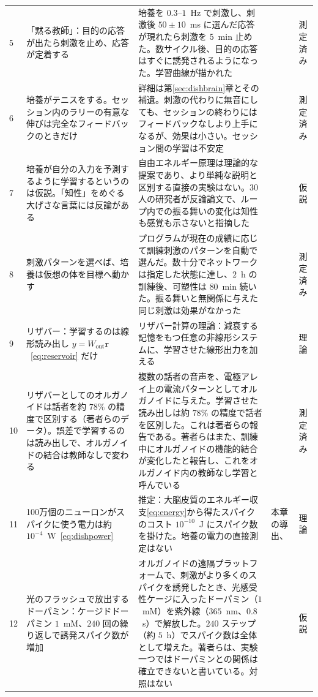 {\begin{longtable}{>{\raggedright}p{0.5cm}>{\raggedright}p{4.0cm}>{\raggedright}p{5.6cm}>{\raggedright}p{2.3cm}>{\raggedright\arraybackslash}p{1.7cm}}
5 & 「黙る教師」：目的の応答が出たら刺激を止め、応答が定着する & 培養を $0.3$--$1$~Hz で刺激し、刺激後 $50\pm10$~ms に選んだ応答が現れたら刺激を $5$~min 止めた。数サイクル後、目的の応答はすぐに誘発されるようになった。学習曲線が描かれた & \cite{Shahaf2001} & 測定済み \\
6 & 培養がテニスをする。セッション内のラリーの有意な伸びは完全なフィードバックのときだけ & 詳細は第\ref{sec:dishbrain}章とその補遺。刺激の代わりに無音にしても、セッションの終わりにはフィードバックなしより上手になるが、効果は小さい。セッション間の学習は不安定 & \cite{Kagan2022} & 測定済み \\
7 & 培養が自分の入力を予測するように学習するというのは仮説。「知性」をめぐる大げさな言葉には反論がある & 自由エネルギー原理は理論的な提案であり、より単純な説明と区別する直接の実験はない。30人の研究者が反論論文で、ループ内での振る舞いの変化は知性も感覚も示さないと指摘した & \cite{Friston2010,Balci2023} & 仮説 \\
8 & 刺激パターンを選べば、培養は仮想の体を目標へ動かす & プログラムが現在の成績に応じて訓練刺激のパターンを自動で選んだ。数十分でネットワークは指定した状態に達し、$2$~h の訓練後、可塑性は $80$~min 続いた。振る舞いと無関係に与えた同じ刺激は効果がなかった & \cite{Bakkum2008} & 測定済み \\
9 & リザバー：学習するのは線形読み出し $y=W_{\text{out}}\mathbf r$~\eqref{eq:reservoir} だけ & リザバー計算の理論：減衰する記憶をもつ任意の非線形システムに、学習させた線形出力を加える & \cite{Maass2002,JaegerHaas2004} & 理論 \\
10 & リザバーとしてのオルガノイドは話者を約 $78\%$ の精度で区別する（著者らのデータ）。誤差で学習するのは読み出しで、オルガノイドの結合は教師なしで変わる & 複数の話者の音声を、電極アレイ上の電流パターンとしてオルガノイドに与えた。学習させた読み出しは約 $78\%$ の精度で話者を区別した。これは著者らの報告である。著者らはまた、訓練中にオルガノイドの機能的結合が変化したと報告し、これをオルガノイド内の教師なし学習と呼んでいる & \cite{Cai2023} & 測定済み \\
11 & 100万個のニューロンがスパイクに使う電力は約 $10^{-4}$~W~\eqref{eq:dishpower} & 推定：大脳皮質のエネルギー収支\eqref{eq:energy}から得たスパイクのコスト $10^{-10}$~J にスパイク数を掛けた。培養の電力の直接測定はない & 本章の導出、\cite{Attwell2001} & 理論 \\
12 & 光のフラッシュで放出するドーパミン：ケージドドーパミン $1$~mM、$240$ 回の繰り返しで誘発スパイク数が増加 & オルガノイドの遠隔プラットフォームで、刺激がより多くのスパイクを誘発したとき、光感受性ケージに入ったドーパミン（$1$~mM）を紫外線（$365$~nm、$0.8$~s）で解放した。$240$ ステップ（約 $5$~h）でスパイク数は全体として増えた。著者らは、実験一つではドーパミンとの関係は確立できないと書いている。対照はない & \cite{Jordan2024} & 仮説 \\

\end{longtable}}
